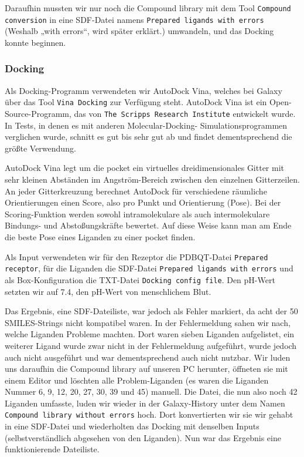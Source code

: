 \documentclass[10pt]{article}
\begin{document}
    Daraufhin mussten wir nur noch die Compound library mit dem Tool \texttt{Compound conversion} in eine SDF-Datei
    namens
    \texttt{Prepared ligands with errors} (Weshalb „with errors“, wird später erklärt.) umwandeln, und das Docking
    konnte
    beginnen.

    \subsubsection{Docking}\label{subsubsec:docking}

    Als Docking-Programm verwendeten wir AutoDock Vina, welches bei Galaxy über das Tool \texttt{Vina Docking} zur
    Verfügung
    steht.\cite{20, 21} AutoDock Vina ist ein Open-Source-Programm, das von \texttt{The Scripps Research
    Institute} entwickelt
    wurde.\cite{29} In
    Tests, in denen es mit anderen Molecular-Docking-
    Simulationsprogrammen verglichen wurde, schnitt es gut bis sehr
    gut ab und findet dementsprechend die größte Verwendung.

    AutoDock Vina legt um die pocket ein virtuelles dreidimensionales Gitter mit sehr kleinen Abständen im
    Angström-Bereich zwischen den einzelnen Gitterzeilen. An jeder Gitterkreuzung berechnet AutoDock für verschiedene
    räumliche Orientierungen einen Score, also pro Punkt und Orientierung (Pose). Bei der Scoring-Funktion werden
    sowohl intramolekulare als auch intermolekulare Bindungs- und Abstoßungskräfte bewertet. Auf diese Weise kann man
    am Ende die beste Pose eines Liganden zu einer pocket finden.

    Als Input verwendeten wir für den Rezeptor die PDBQT-Datei \texttt{Prepared receptor}, für die Liganden die
    SDF-Datei
    \texttt{Prepared ligands with errors} und als Box-Konfiguration die TXT-Datei \texttt{Docking config file}. Den
    pH-Wert setzten
    wir auf 7.4, den pH-Wert von menschlichem Blut.

    Das Ergebnis, eine SDF-Dateiliste, war jedoch als Fehler markiert, da acht der 50 SMILES-Strings nicht kompatibel
    waren. In der Fehlermeldung sahen wir nach, welche Liganden Probleme machten. Dort waren sieben Liganden
    aufgelistet, ein weiterer Ligand wurde zwar nicht in der Fehlermeldung aufgeführt, wurde jedoch auch nicht
    ausgeführt und war dementsprechend auch nicht nutzbar. Wir luden uns daraufhin die Compound library auf unseren
    PC herunter, öffneten sie mit einem Editor und löschten alle Problem-Liganden (es waren die Liganden Nummer 6, 9,
    12, 20, 27, 30, 39 und 45) manuell. Die Datei, die nun also noch 42 Liganden umfasste, luden wir wieder in der
    Galaxy-History unter dem Namen \texttt{Compound library without errors} hoch. Dort konvertierten wir sie wir
    gehabt in
    eine SDF-Datei und wiederholten das Docking mit denselben Inputs (selbstverständlich abgesehen von den Liganden).
    Nun war das Ergebnis eine funktionierende Dateiliste.
\end{document}
